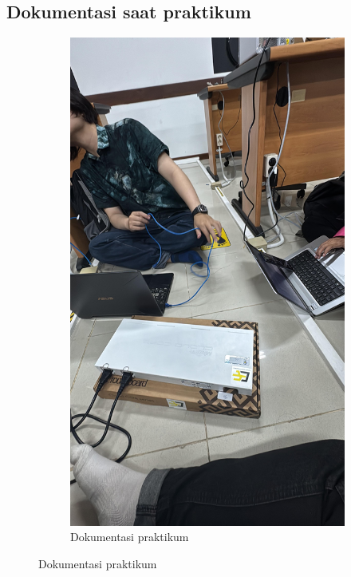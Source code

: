 \subsection{Dokumentasi saat praktikum}
\begin{figure}[H]
	\centering
	\begin{subfigure}[b]{0.4\linewidth}
		\includegraphics[width=\linewidth]{P5/img/dokum.jpg}
		\caption{Dokumentasi praktikum\label{fig:konfigurasiR1}}
	\end{subfigure}
\end{figure}